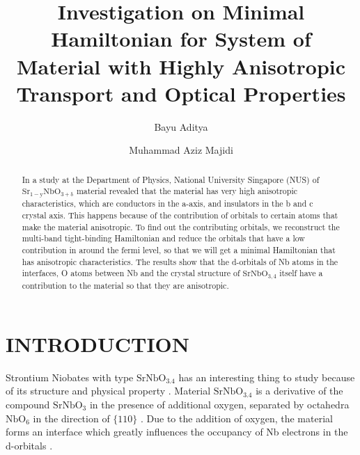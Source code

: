 \documentclass{aip-cp}
\begin{document}
\title{Investigation on Minimal Hamiltonian for System of Material with Highly Anisotropic Transport and Optical Properties}

\author{Bayu Aditya}
\author{Muhammad Aziz Majidi}


\maketitle


\begin{abstract}
In a study at the Department of Physics, National University Singapore (NUS) of $\mathrm{Sr_{1-y}NbO_{3+\delta}}$ material revealed that the material has very high anisotropic characteristics, which are conductors in the a-axis, and insulators in the b and c crystal axis. This happens because of the contribution of orbitals to certain atoms that make the material anisotropic. To find out the contributing orbitals, we reconstruct the multi-band tight-binding Hamiltonian and reduce the orbitals that have a low contribution in around the fermi level, so that we will get a minimal Hamiltonian that has anisotropic characteristics. The results show that the d-orbitals of Nb atoms in the interfaces, O atoms between Nb and the crystal structure of $\mathrm{SrNbO_{3,4}}$ itself have a contribution to the material so that they are anisotropic.
\end{abstract}

\section{INTRODUCTION}
Strontium Niobates with type $\mathrm{SrNbO_{3.4}} $ has an interesting thing to study because of its structure and physical property \cite{andrivo}. Material $\mathrm{SrNbO_{3.4}}$ is a derivative of the compound $\mathrm{SrNbO_{3}}$ in the presence of additional oxygen, separated by octahedra $\mathrm{NbO_{6}}$ in the direction of $\{110\}$ \cite{LICHTENBERG2001,LICHTENBERG2008}. Due to the addition of oxygen, the material forms an interface which greatly influences the occupancy of Nb electrons in the d-orbitals \cite{chen}.
\end{document}
